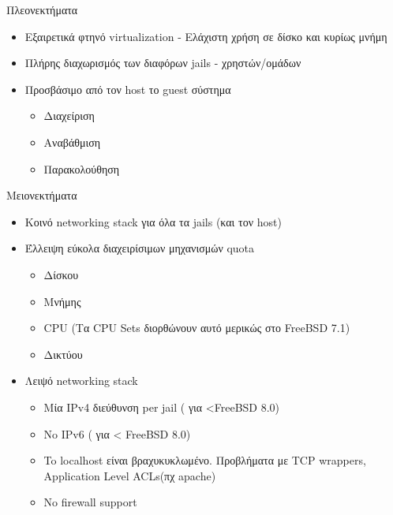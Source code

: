\documentclass{beamer}
\begin{document}
    \begin{frame}{Πλεονεκτήματα}
        \begin{itemize}
            \item Εξαιρετικά φτηνό virtualization - Ελάχιστη χρήση σε δίσκο και κυρίως μνήμη
            \pause \item Πλήρης διαχωρισμός των διαφόρων jails - χρηστών/ομάδων
            \pause \item Προσβάσιμο από τον host το guest σύστημα 
            \begin{itemize}
                \item Διαχείριση
                \item Αναβάθμιση
                \item Παρακολούθηση
            \end{itemize}
        \end{itemize}
    \end{frame}

    \begin{frame}{Μειονεκτήματα}
        \begin{itemize}
        \item Κοινό networking stack για όλα τα jails (και τον host)
        \pause \item Έλλειψη εύκολα διαχειρίσιμων μηχανισμών quota
        \begin{itemize}
            \pause \item Δίσκου
            \pause \item Μνήμης
            \pause \item CPU (Τα CPU Sets διορθώνουν αυτό μερικώς στο FreeBSD 7.1)
            \pause \item Δικτύου
        \end{itemize}
        \pause \item Λειψό networking stack
            \begin{itemize}
                \pause \item Μία IPv4 διεύθυνση per jail ( για <FreeBSD 8.0)
                \pause \item No IPv6 ( για < FreeBSD 8.0)
                \pause \item To localhost είναι βραχυκυκλωμένο. Προβλήματα με TCP wrappers,
                             Application Level ACLs(πχ apache)
                \pause \item No firewall support
            \end{itemize}
        \end{itemize}
    \end{frame}
\end{document}
